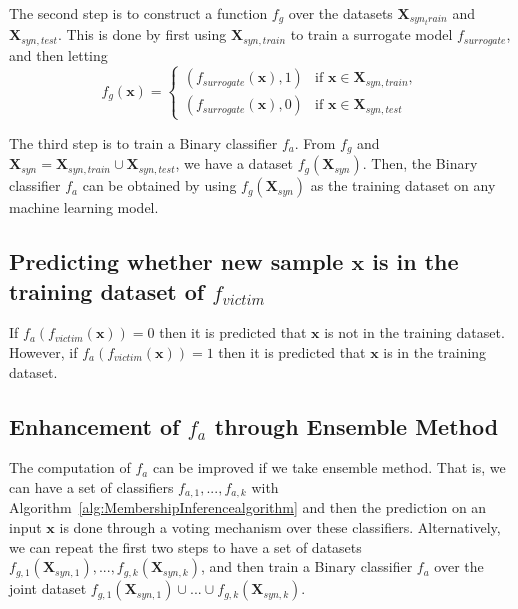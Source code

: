 The second step is to construct a function $f_g$ over the datasets $\textbf{X}_{syn_train}$ and $\textbf{X}_{syn,test}$. 
This is done by first using $\textbf{X}_{syn, train}$ to train a surrogate model $f_{surrogate}$, and then letting 
\begin{equation}
    f_g(\textbf{x}) = \left \{
      \begin{array}{cl}
         (f_{surrogate}(\textbf{x}),1)  &     \text{if } \textbf{x}\in \textbf{X}_{syn, train},\\
         (f_{surrogate}(\textbf{x}),0)  &      \text{if } \textbf{x}\in \textbf{X}_{syn, test}
      \end{array}
    \right.
\end{equation} 


The third step is to train a Binary classifier $f_a$. 
From $f_g$ and $\textbf{X}_{syn}=\textbf{X}_{syn,train}\cup \textbf{X}_{syn,test}$, we have a dataset $f_g(\textbf{X}_{syn})$. Then, the Binary classifier $f_a$ can be obtained by using $f_g(\textbf{X}_{syn})$ as the training dataset on any machine learning model. 



\subsection*{Predicting whether new sample $\textbf{x}$ is in the training dataset of $f_{victim}$} If $f_a(f_{victim}(\textbf{x}))=0$ then it is predicted that $\textbf{x}$ is not in the training dataset. However, if $f_a(f_{victim}(\textbf{x}))=1$ then it is predicted that $\textbf{x}$ is in the training dataset. 

\subsection*{Enhancement of $f_a$ through Ensemble Method}

The computation of $f_a$ can be improved if we take ensemble method. That is, we can have a set of classifiers $f_{a,1},...,f_{a,k}$ with Algorithm~\ref{alg:MembershipInferencealgorithm} and then the prediction on an input $\textbf{x}$ is done through a voting mechanism over these classifiers. Alternatively, we can repeat the first two steps to have a set of datasets $f_{g,1}(\textbf{X}_{syn,1}), ..., f_{g,k}(\textbf{X}_{syn,k})$, and then train a Binary classifier $f_a$ over the joint dataset $f_{g,1}(\textbf{X}_{syn,1})\cup ...\cup f_{g,k}(\textbf{X}_{syn,k})$. 


